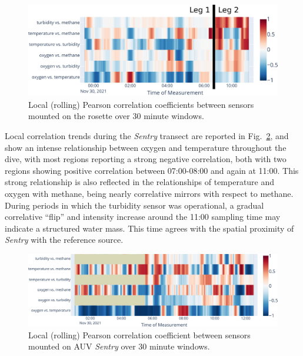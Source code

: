 \begin{figure}[h!]
    \centering
    \includegraphics[width=\columnwidth]{figures/chap3_rosette_local_corr_all.jpg}
    \caption[Local (rolling) Pearson correlation coefficients for rosette mounted instruments]{Local (rolling) Pearson correlation coefficients between sensors mounted on the rosette over 30 minute windows.}
    \label{fig:rosette_local}
\end{figure}

Local correlation trends during the \emph{Sentry} transect are reported in Fig.~\ref{fig:sentry_local}, and show an intense relationship between oxygen and temperature throughout the dive, with most regions reporting a strong negative correlation, both with two regions showing positive correlation between 07:00-08:00 and again at 11:00. This strong relationship is also reflected in the relationships of temperature and oxygen with methane, being nearly correlative mirrors with respect to methane. During periods in which the turbidity sensor was operational, a gradual correlative ``flip'' and intensity increase around the 11:00 sampling time may indicate a structured water mass. This time agrees with the spatial proximity of \emph{Sentry} with the reference source.

\begin{figure}[h!]
    \centering
    \includegraphics[width=1\columnwidth]{figures/chap3_sentry_local_corr_all.jpg}
    \caption[Local (rolling) Pearson correlation coefficients for AUV \Sentry mounted instruments]{Local (rolling) Pearson correlation coefficient between sensors mounted on AUV \emph{Sentry} over 30 minute windows.}
    \label{fig:sentry_local}
\end{figure}

